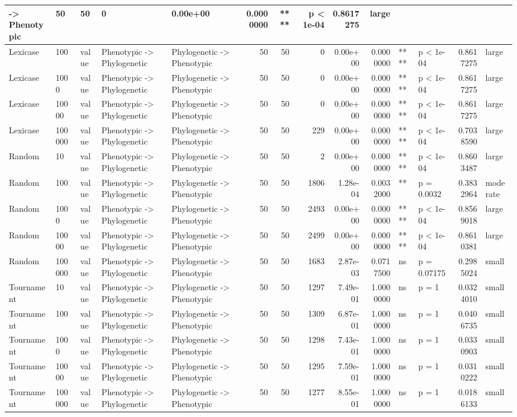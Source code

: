 \documentclass[]{book}
\begin{document}
\begin{table}
\begin{tabular}[t]{l|l|l|l|l|r|r|r|r|r|l|l|r|l}
    ->
Phenotypic & 50 & 50 & 0 & 0.00e+00 & 0.0000000 & **** & p < 1e-04 & 0.8617275 & large\\
\hline
Lexicase & 100 & value & Phenotypic
    ->
Phylogenetic & Phylogenetic
    ->
Phenotypic & 50 & 50 & 0 & 0.00e+00 & 0.0000000 & **** & p < 1e-04 & 0.8617275 & large\\
\hline
Lexicase & 1000 & value & Phenotypic
    ->
Phylogenetic & Phylogenetic
    ->
Phenotypic & 50 & 50 & 0 & 0.00e+00 & 0.0000000 & **** & p < 1e-04 & 0.8617275 & large\\
\hline
Lexicase & 10000 & value & Phenotypic
    ->
Phylogenetic & Phylogenetic
    ->
Phenotypic & 50 & 50 & 0 & 0.00e+00 & 0.0000000 & **** & p < 1e-04 & 0.8617275 & large\\
\hline
Lexicase & 100000 & value & Phenotypic
    ->
Phylogenetic & Phylogenetic
    ->
Phenotypic & 50 & 50 & 229 & 0.00e+00 & 0.0000000 & **** & p < 1e-04 & 0.7038590 & large\\
\hline
Random & 10 & value & Phenotypic
    ->
Phylogenetic & Phylogenetic
    ->
Phenotypic & 50 & 50 & 2 & 0.00e+00 & 0.0000000 & **** & p < 1e-04 & 0.8603487 & large\\
\hline
Random & 100 & value & Phenotypic
    ->
Phylogenetic & Phylogenetic
    ->
Phenotypic & 50 & 50 & 1806 & 1.28e-04 & 0.0032000 & ** & p = 0.0032 & 0.3832964 & moderate\\
\hline
Random & 1000 & value & Phenotypic
    ->
Phylogenetic & Phylogenetic
    ->
Phenotypic & 50 & 50 & 2493 & 0.00e+00 & 0.0000000 & **** & p < 1e-04 & 0.8569018 & large\\
\hline
Random & 10000 & value & Phenotypic
    ->
Phylogenetic & Phylogenetic
    ->
Phenotypic & 50 & 50 & 2499 & 0.00e+00 & 0.0000000 & **** & p < 1e-04 & 0.8610381 & large\\
\hline
Random & 100000 & value & Phenotypic
    ->
Phylogenetic & Phylogenetic
    ->
Phenotypic & 50 & 50 & 1683 & 2.87e-03 & 0.0717500 & ns & p = 0.07175 & 0.2985024 & small\\
\hline
Tournament & 10 & value & Phenotypic
    ->
Phylogenetic & Phylogenetic
    ->
Phenotypic & 50 & 50 & 1297 & 7.49e-01 & 1.0000000 & ns & p = 1 & 0.0324010 & small\\
\hline
Tournament & 100 & value & Phenotypic
    ->
Phylogenetic & Phylogenetic
    ->
Phenotypic & 50 & 50 & 1309 & 6.87e-01 & 1.0000000 & ns & p = 1 & 0.0406735 & small\\
\hline
Tournament & 1000 & value & Phenotypic
    ->
Phylogenetic & Phylogenetic
    ->
Phenotypic & 50 & 50 & 1298 & 7.43e-01 & 1.0000000 & ns & p = 1 & 0.0330903 & small\\
\hline
Tournament & 10000 & value & Phenotypic
    ->
Phylogenetic & Phylogenetic
    ->
Phenotypic & 50 & 50 & 1295 & 7.59e-01 & 1.0000000 & ns & p = 1 & 0.0310222 & small\\
\hline
Tournament & 100000 & value & Phenotypic
    ->
Phylogenetic & Phylogenetic
    ->
Phenotypic & 50 & 50 & 1277 & 8.55e-01 & 1.0000000 & ns & p = 1 & 0.0186133 & small\\
\hline
\end{tabular}
\end{table}
\end{document}
